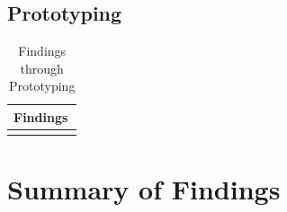 \subsection{Prototyping}

\begin{longtable}{|p{0.96\linewidth}|}
\caption{Findings through Prototyping}\\
\hline
\textbf{Findings} \\
\hline

\\
\hline
\end{longtable}

\section{Summary of Findings}

